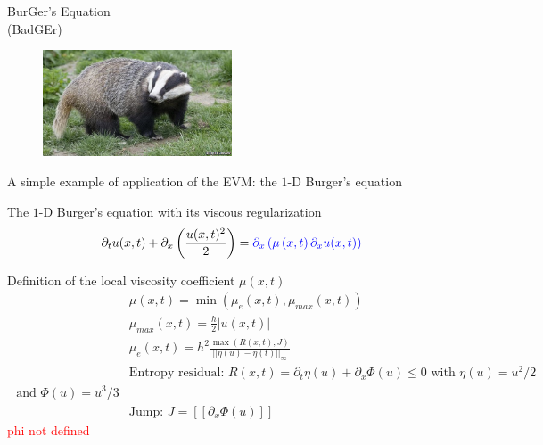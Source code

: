 \documentclass[xcolor=dvipsnames,10pt]{beamer}
\newcommand{\tcr}[1]{\textcolor{red}{#1}}
\begin{document}
\begin{frame}
\begin{center}
BurGer's Equation \\
(BadGEr)
\end{center}
\begin{figure}[H]
\centering
\includegraphics[width=0.5\textwidth]{../figures/badger.png}
\end{figure}
\end{frame}
\begin{frame}{A simple example of application of the EVM: the $1$-D Burger's equation}
\begin{block}{The $1$-D Burger's equation with its viscous regularization}
\begin{equation}
\partial_t u(x,t) + \partial_x \left( \frac{u(x,t)^2}{2} \right) = \textcolor{blue}{\partial_x \left( \mu \left(x,t \right) \partial_x u(x,t) \right)} \nonumber
\end{equation}
\end{block}
\begin{block}{Definition of the local viscosity coefficient $\mu(x,t)$}
\begin{align}
&\mu(x,t) = \min \left( \mu_e(x,t), \mu_{max}(x,t) \right) \nonumber \\
&\mu_{max} (x,t) = \frac{h}{2} | u(x,t) | \nonumber \\
&\mu_e(x,t) = h^2 \frac{\max \left( R(x,t), J \right)}{|| \eta(u) - \bar{\eta}(t) ||_\infty} \nonumber \\
& \text{Entropy residual: }R(x,t) = \partial_t \eta(u) + \partial_x \Phi(u) \leq 0 \text{ with } \eta(u) = u^2 / 2 \nonumber \\
\text{ and } \Phi(u) = u^3 / 3 \nonumber \\
&\text{Jump: } J = [[ \partial_x \Phi(u) ]] \nonumber
\end{align}
\tcr{phi not defined}
\end{block}
\end{frame}
\end{document}
